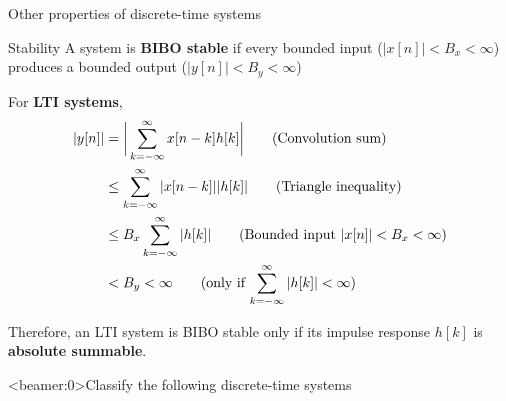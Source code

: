 \documentclass[10pt, handout]{beamer}
\begin{document}
\begin{frame}{Other properties of discrete-time systems}
	
	\begin{block}{Stability}
		A system is \textbf{BIBO stable} if every bounded input ($|x[n]| < B_x < \infty$) produces a bounded output ($|y[n]| < B_y < \infty$)

		\vspace{0.25cm}
		For \textbf{LTI systems},
		\vspace{-0.25cm}
		\begin{align*}
		|y[n]| &= \bigg|\sum_{k = -\infty}^{\infty} x[n-k]h[k]\bigg| \tag{Convolution sum} \\
		&\leq \sum_{k = -\infty}^{\infty} |x[n-k]||h[k]| \tag{Triangle inequality} \\
		& \leq B_x\sum_{k = -\infty}^{\infty} |h[k]| \tag{Bounded input $|x[n]| < B_x < \infty$} \\
		& < B_y < \infty \tag{only if $\displaystyle\sum_{k=-\infty}^{\infty}|h[k]| < \infty$}
		\end{align*}
		\vspace{-0.3cm}
		 
		 Therefore, an LTI system is BIBO stable only if its impulse response $h[k]$ is \textbf{absolute summable}.
	\end{block}
\end{frame}


%
\begin{frame}<beamer:0>{Classify the following discrete-time systems}
	\centering
\end{frame}
\end{document}
